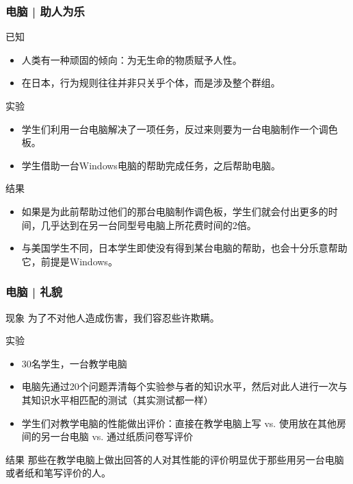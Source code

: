 \begin{frame}
  \frametitle{电脑 | 助人为乐}
  \begin{block}{已知}
    \begin{itemize}
      \item 人类有一种顽固的倾向：为无生命的物质赋予人性。
      \item 在日本，行为规则往往并非只关乎个体，而是涉及整个群组。
    \end{itemize}
  \end{block}
  \pause
  \begin{block}{实验}
    \begin{itemize}
      \item 学生们利用一台电脑解决了一项任务，反过来则要为一台电脑制作一个调色板。
      \item 学生借助一台Windows电脑的帮助完成任务，之后帮助电脑。
    \end{itemize}
  \end{block}
  \pause
  \begin{block}{结果}
    \begin{itemize}
      \item 如果是为此前帮助过他们的那台电脑制作调色板，学生们就会付出更多的时间，几乎达到在另一台同型号电脑上所花费时间的2倍。
      \item 与美国学生不同，日本学生即使没有得到某台电脑的帮助，也会十分乐意帮助它，前提是Windows。
    \end{itemize}
  \end{block}
\end{frame}

\begin{frame}
  \frametitle{电脑 | 礼貌}
  \begin{block}{现象}
    为了不对他人造成伤害，我们容忍些许欺瞒。
  \end{block}
  \pause
  \begin{block}{实验}
    \begin{itemize}
      \item 30名学生，一台教学电脑
      \item 电脑先通过20个问题弄清每个实验参与者的知识水平，然后对此人进行一次与其知识水平相匹配的测试（其实测试都一样）
      \item 学生们对教学电脑的性能做出评价：直接在教学电脑上写 vs. 使用放在其他房间的另一台电脑 vs. 通过纸质问卷写评价
    \end{itemize}
  \end{block}
  \pause
  \begin{block}{结果}
    那些在教学电脑上做出回答的人对其性能的评价明显优于那些用另一台电脑或者纸和笔写评价的人。
  \end{block}
\end{frame}

